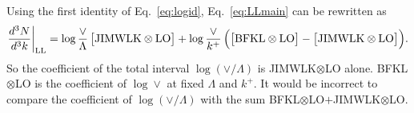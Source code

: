 Using the first identity of Eq.~\eqref{eq:logid}, Eq.~\eqref{eq:LLmain} can be rewritten as
\begin{equation}
\frac{d^3N}{d^3k}\bigg|_{\rm LL}=\log\frac{\vee}{\Lambda}\,\big[{\rm JIMWLK}\otimes{\rm LO}\big]+\log\frac{\vee}{k^+}\,\Big(\big[{\rm BFKL}\otimes{\rm LO}\big]-\big[{\rm JIMWLK}\otimes{\rm LO}\big]\Big).
\end{equation}
So the coefficient of the total interval $\log(\vee/\Lambda)$ is JIMWLK$\otimes$LO alone. BFKL$\otimes$LO is the coefficient of $\log\vee$ at fixed $\Lambda$ and $k^+$. It would be incorrect to compare the coefficient of $\log(\vee/\Lambda)$ with the sum BFKL$\otimes$LO$+$JIMWLK$\otimes$LO.
